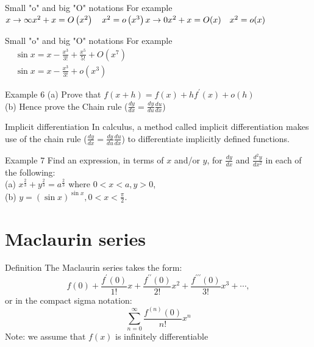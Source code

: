 \documentclass{beamer}
\begin{document}
\begin{frame}{Small "o" and big "O" notations}
For example\\
    $
    x \rightarrow \infty \\ 
    x^2+x=O\left(x^2\right) \quad  x^2=o\left(x^3\right) \\ 
    x \rightarrow 0 \\ 
    x^2+x=O(x) \quad  x^2=o(x)
    $
\end{frame}

\begin{frame}{Small "o" and big "O" notations}
For example\\
$\begin{aligned} & \sin x=x-\frac{x^3}{3 !}+\frac{x^5}{5 !}+O\left(x^7\right) \\ & \sin x=x-\frac{x^3}{3 !}+o\left(x^3\right)\end{aligned}$
\end{frame}

\begin{frame}{Example 6}
    (a) Prove that $f(x+h)=f(x)+h f^{\prime}(x)+o(h)$\\
    (b) Hence prove the Chain rule ($\frac{d y}{d x}=\frac{d y}{d u} \frac{d u}{d x}$)
\end{frame}

\begin{frame}{Implicit differentiation}
    In calculus, a method called implicit differentiation makes use of the chain rule ($\frac{d y}{d x}=\frac{d y}{d u} \frac{d u}{d x}$) to differentiate implicitly defined functions.
\end{frame}

\begin{frame}{Example 7}
Find an expression, in terms of $x$ and/or $y$, for $\frac{d y}{d x}$ and $\frac{d^2 y}{d x^2}$ in each of the following:\\
(a) $x^{\frac{2}{3}}+y^{\frac{2}{3}}=a^{\frac{2}{3}}$ where $0<x<a, y>0$,\\
(b) $y=(\sin x)^{\sin x}, 0<x<\frac{\pi}{2}$.
\end{frame}

\section{Maclaurin series}
\begin{frame}{Definition}
    The Maclaurin series takes the form:
$$
f(0)+\frac{f^{\prime}(0)}{1 !} x+\frac{f^{\prime \prime}(0)}{2 !} x^2+\frac{f^{\prime \prime \prime}(0)}{3 !} x^3+\cdots,
$$
or in the compact sigma notation:
$$
\sum_{n=0}^{\infty} \frac{f^{(n)}(0)}{n !} x^n
$$
Note: we assume that $f(x)$ is infinitely differentiable
\end{frame}
\end{document}
